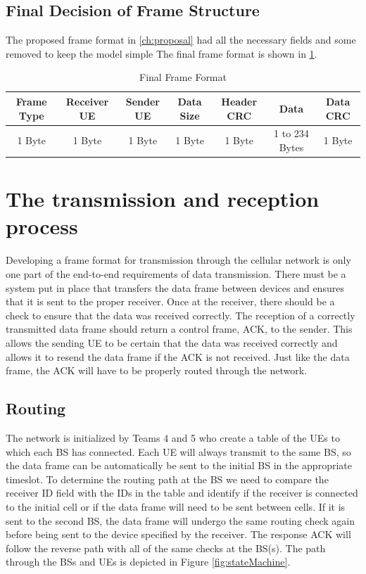 \subsection{Final Decision of Frame Structure}



The proposed frame format in \ref{ch:proposal} had all the necessary fields and some removed to keep the model simple
The final frame format is  shown in \ref{tab:finalFrame}.

\begin{table}
\begin{center}
\begin{tabular}{| c | c | c | c | c | c | c | }
  \hline                       
  Frame Type & Receiver UE & Sender UE & Data Size & Header CRC & Data & Data CRC\\
  \hline
	1 Byte & 1 Byte & 1 Byte & 1 Byte & 1 Byte & 1 to 234 Bytes & 1 Byte\\
  
  \hline  
\end{tabular}
\end{center}
 \caption{Final Frame Format}
	\label{tab:finalFrame}
\end{table}


\section{The transmission and reception process}

Developing a frame format for transmission through the cellular network is only one part of the end-to-end requirements of data transmission. There must be a system put in place that transfers the data frame between devices and ensures that it is sent to the proper receiver. Once at the receiver, there should be a check to ensure that the data was received correctly. The reception of a correctly transmitted data frame should return a control frame, ACK, to the sender.  This allows the sending UE to be certain that the data was received correctly and allows it to resend the data frame if the ACK is not received. Just like the data frame, the ACK will have to be properly routed through the network. 

\subsection {Routing}

The network is initialized by Teams 4 and 5 who create a table of the UEs to which each BS has connected. Each UE will always transmit to the same BS, so the data frame can be automatically be sent to the initial BS in the appropriate timeslot.  To determine the routing path at the BS we need to compare the receiver ID field with the IDs in the table and identify if the receiver is connected to the initial cell or if the data frame will need to be sent between cells. If it is sent to the second BS, the data frame will undergo the same routing check again before being sent to the device specified by the receiver. The response ACK will follow the reverse path with all of the same checks at the BS(s). The path through the BSs and UEs is depicted in Figure \ref{fig:stateMachine}.

